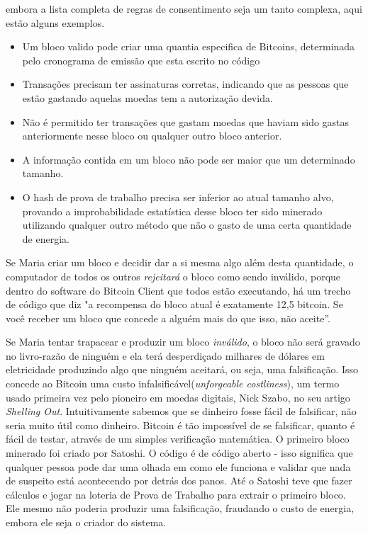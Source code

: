 embora a lista completa de regras de consentimento seja um tanto complexa, aqui estão alguns exemplos.
\begin{itemize}
    \item  Um bloco valido pode criar uma quantia especifica de Bitcoins, determinada pelo cronograma de emissão que esta escrito no código
    \item  Transações precisam ter assinaturas corretas, indicando que as pessoas que estão gastando aquelas moedas tem a autorização devida.
    \item Não é permitido ter transações que gastam moedas que haviam sido gastas anteriormente nesse bloco ou qualquer outro bloco anterior.
    \item A informação contida em um bloco não pode ser maior que um determinado tamanho.
    \item O hash de prova de trabalho precisa ser inferior ao atual tamanho alvo, provando a improbabilidade estatística desse bloco ter sido minerado utilizando qualquer outro método que não o gasto de uma certa quantidade de energia.
\end{itemize}
%
Se Maria criar um bloco e decidir dar a si mesma algo além desta quantidade, o computador de todos os outros \textit{rejeitará} o bloco como sendo inválido, porque dentro do software do Bitcoin Client que todos estão executando, há um trecho de código que diz "a recompensa do bloco atual é exatamente 12,5 bitcoin. Se você receber um bloco que concede a alguém mais do que isso, não aceite”.

Se Maria tentar trapacear e produzir um bloco \textit{inválido}, o bloco não será gravado no livro-razão de ninguém e ela terá desperdiçado milhares de dólares em eletricidade produzindo algo que ninguém aceitará, ou seja, uma falsificação.
Isso concede ao Bitcoin uma custo infalsificável(\textit{unforgeable costliness}), um termo usado primeira vez pelo pioneiro em moedas digitais, Nick Szabo, no seu artigo \textit{Shelling Out}. Intuitivamente sabemos que se dinheiro fosse fácil de falsificar, não seria muito útil como dinheiro. Bitcoin é tão impossível de se falsificar, quanto é fácil de testar, através de um simples verificação matemática.
%   
O primeiro bloco minerado foi criado por Satoshi. O código é de código aberto - isso significa que qualquer pessoa pode dar uma olhada em como ele funciona e validar que nada de suspeito está acontecendo por detrás dos panos. Até o Satoshi teve que fazer cálculos e jogar na loteria de Prova de Trabalho para extrair o primeiro bloco.%
Ele mesmo não poderia produzir uma falsificação, fraudando o custo de energia, embora ele seja o criador do sistema.

